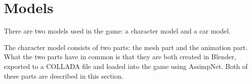 \section{Models} \label{sec:theory_theory_models}
There are two models used in the game: a character model and a car model.

The character model consists of two parts: the mesh part and the animation part.
What the two parts have in common is that they are both created in Blender, exported to a COLLADA file and loaded into the game using AssimpNet.
Both of these parts are described in this section.



